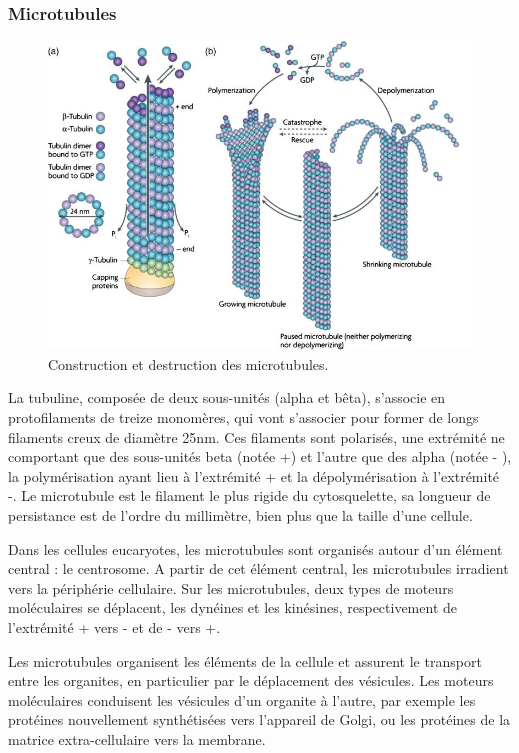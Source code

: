 \subsubsection{Microtubules}

\begin{figure}
\includegraphics[scale=0.5]{Microtubule.png}
\caption{Construction et destruction des microtubules.}
\end{figure}
La tubuline, composée de deux sous-unités (alpha et bêta), s'associe en protofilaments de treize monomères, qui vont s'associer pour former de longs filaments creux de diamètre 25nm. Ces filaments sont polarisés, une extrémité ne comportant que des sous-unités beta (notée +) et l'autre que des alpha (notée - ), la polymérisation ayant lieu à l'extrémité + et la dépolymérisation à l'extrémité -. 
Le microtubule est le filament le plus rigide du cytosquelette, sa longueur de persistance est de l'ordre du millimètre, bien plus que la taille d'une cellule. 

Dans les cellules eucaryotes, les microtubules sont organisés autour d'un élément central : le centrosome. A partir de cet élément central, les microtubules irradient vers la périphérie cellulaire. 
Sur les microtubules, deux types de moteurs moléculaires se déplacent, les dynéines et les kinésines, respectivement de l'extrémité + vers - et de - vers +.  

Les microtubules organisent les éléments de la cellule et assurent le transport entre les organites, en particulier par le déplacement des vésicules. Les moteurs moléculaires conduisent les vésicules d'un organite à l'autre, par exemple les protéines nouvellement synthétisées vers l'appareil de Golgi, ou les protéines de la matrice extra-cellulaire vers la membrane. 

